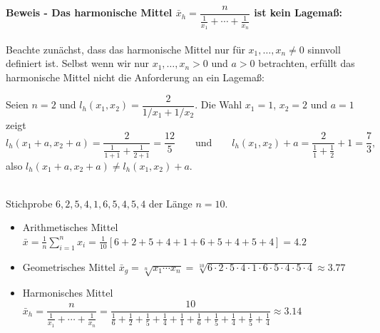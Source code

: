 \begin{bsp}
    \smallskip

    \paragraph{Beweis - Das harmonische Mittel $\bar x_h = \dfrac{n}{\frac1{x_1}+\cdots+\frac1{x_n}}$ ist kein Lagemaß:}

    Beachte zunächst, dass das harmonische Mittel nur für $x_1,\dots,x_n\neq 0$ sinnvoll definiert ist.
    Selbst wenn wir nur $x_1,\dots,x_n>0$ und $a>0$ betrachten, erfüllt das harmonische Mittel nicht die Anforderung an ein \gls{Lagemaß}:

    Seien $n=2$ und $l_h(x_1,x_2) = \dfrac{2}{1/x_1+1/x_2}$.
    Die Wahl $x_1=1$, $x_2=2$ und $a=1$ zeigt
    \[
        l_h(x_1+a,x_2+a) = \frac{2}{\frac1{1+1}+\frac1{2+1}} = \frac{12}{5}
        \qquad\text{und}\qquad
        l_h(x_1,x_2)+a = \frac{2}{\frac11+\frac12}+1 = \frac73 ,
    \]
    also $l_h(x_1+a,x_2+a)\neq l_h(x_1,x_2)+a$.
\end{bsp}

\begin{bsp}
     \\
    Stichprobe $6,2,5,4,1,6,5,4,5,4$ der Länge $n=10$.

    \begin{figure}[H]
        \label{fig:figure8}
    \end{figure}

    \begin{itemize}
        \item Arithmetisches Mittel $\bar x = \frac1n\sum_{i=1}^n x_i = \frac1{10}[6+2+5+4+1+6+5+4+5+4] = 4.2$
        \item Geometrisches Mittel $\bar x_g = \sqrt[n]{x_1\cdots x_n} = \sqrt[10]{6\cdot2\cdot5\cdot4\cdot1\cdot6\cdot5\cdot4\cdot5\cdot4} \approx 3.77$
        \item Harmonisches Mittel $\bar x_h = \dfrac{n}{\frac1{x_1}+\cdots+\frac1{x_n}} = \dfrac{10}{\frac16+\frac12+\frac15+\frac14+\frac11+\frac16+\frac15+\frac14+\frac15+\frac14} \approx 3.14$
    \end{itemize}
\end{bsp}


